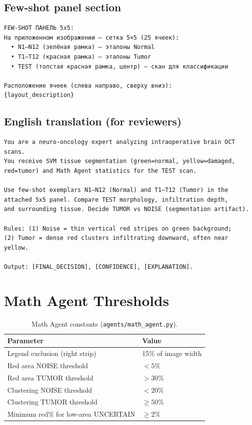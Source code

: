 \documentclass[11pt]{article}
\begin{document}
\subsection{Few-shot panel section}
\begin{lstlisting}[style=prompt,basicstyle=\footnotesize\ttfamily]
FEW-SHOT ПАНЕЛЬ 5x5:
На приложенном изображении — сетка 5×5 (25 ячеек):
  • N1–N12 (зелёная рамка) — эталоны Normal
  • T1–T12 (красная рамка) — эталоны Tumor
  • TEST (толстая красная рамка, центр) — скан для классификации

Расположение ячеек (слева направо, сверху вниз):
{layout_description}
\end{lstlisting}

\subsection{English translation (for reviewers)}
\begin{lstlisting}[style=prompt,basicstyle=\footnotesize\ttfamily]
You are a neuro-oncology expert analyzing intraoperative brain OCT scans.
You receive SVM tissue segmentation (green=normal, yellow=damaged,
red=tumor) and Math Agent statistics for the TEST scan.

Use few-shot exemplars N1–N12 (Normal) and T1–T12 (Tumor) in the
attached 5x5 panel. Compare TEST morphology, infiltration depth,
and surrounding tissue. Decide TUMOR vs NOISE (segmentation artifact).

Rules: (1) Noise = thin vertical red stripes on green background;
(2) Tumor = dense red clusters infiltrating downward, often near yellow.

Output: [FINAL_DECISION], [CONFIDENCE], [EXPLANATION].
\end{lstlisting}

\section{Math Agent Thresholds}
\label{app:math}

\begin{table}[ht]
  \centering
  \caption{Math Agent constants (\texttt{agents/math\_agent.py}).}
  \begin{tabular}{ll}
    \toprule
    Parameter & Value \\
    \midrule
    Legend exclusion (right strip) & 15\% of image width \\
    Red area NOISE threshold & $< 5\%$ \\
    Red area TUMOR threshold & $> 30\%$ \\
    Clustering NOISE threshold & $< 20\%$ \\
    Clustering TUMOR threshold & $\geq 50\%$ \\
    Minimum red\% for low-area UNCERTAIN & $\geq 2\%$ \\
    \bottomrule
  \end{tabular}
\end{table}
\end{document}
